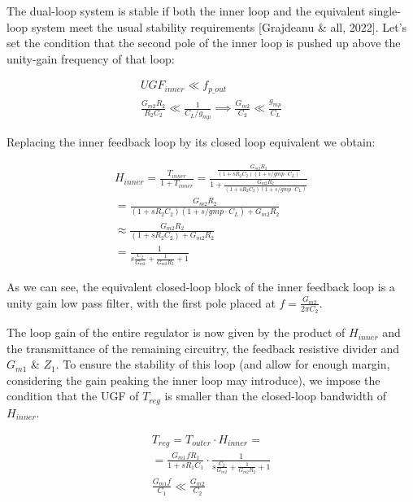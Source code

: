 \documentclass[
]{article}
\begin{document}
The dual-loop system is stable if both the inner loop and the equivalent
single-loop system meet the usual stability requirements {[}Grajdeanu \&
all, 2022{]}. Let's set the condition that the second pole of the inner
loop is pushed up above the unity-gain frequency of that loop:

\begin{gather}
    UGF_{inner}  \ll f_{p\_out} \nonumber \\
    \frac{G_{m2}R_2}{R_2C_2}    \ll \frac{1}{C_L/g_{mp}} \implies \frac{G_{m2}}{C_2}    \ll \frac{g_{mp}}{C_L} \label{eq:classical_output_pole_constraint}
\end{gather}

Replacing the inner feedback loop by its closed loop equivalent we
obtain:

\begin{gather}
    H_{inner} = \frac{T_{inner}}{1 + T_{inner}} = \frac{\frac{G_{m2}R_2}{(1+sR_2C_2)(1+s/gmp \cdot C_L)}}{1+\frac{G_{m2}R_2}{(1+sR_2C_2)(1+s/gmp \cdot C_L)}}
    \\ = \frac{G_{m2}R_2}{(1+sR_2C_2)(1+s/gmp \cdot C_L) + G_{m2}R_2} \\
    \approx \frac{G_{m2}R_2}{(1+sR_2C_2) + G_{m2}R_2}
    \\ = \frac{1}{s\frac{C_2}{G_{m2}} + \frac{1}{G_{m2}R_2} + 1}
\end{gather}

As we can see, the equivalent closed-loop block of the inner feedback
loop is a unity gain low pass filter, with the first pole placed at
\(f = \frac{G_{m2}}{2 \pi C_2}\).

The loop gain of the entire regulator is now given by the product of
\(H_{inner}\) and the transmittance of the remaining circuitry, the
feedback resistive divider and \(G_{m1}\) \& \(Z_1\). To ensure the
stability of this loop (and allow for enough margin, considering the
gain peaking the inner loop may introduce), we impose the condition that
the UGF of \(T_{reg}\) is smaller than the closed-loop bandwidth of
\(H_{inner}\).

\begin{gather}
    T_{reg} = T_{outer} \cdot H_{inner} = \nonumber \\
    = \frac{G_{m1}fR_1}{1+sR_1C_1} \cdot \frac{1}{s\frac{C_2}{G_{m2}} + \frac{1}{G_{m2}R_2} + 1} \nonumber \\
    \frac{G_{m1}f}{C_1} \ll \frac{G_{m2}}{C_2} \label{eq:classical_treg_ugf_constraint}
\end{gather}
\end{document}
